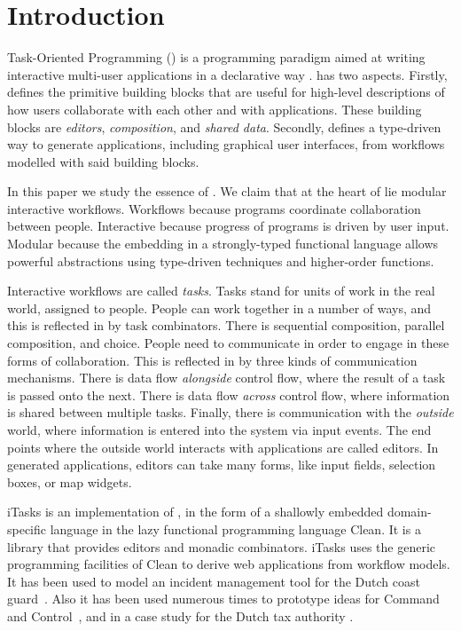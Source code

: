 


\section{Introduction}

Task-Oriented Programming (\TOP) is a programming paradigm aimed at writing interactive multi-user applications in a declarative way \cite{conf/ppdp/PlasmeijerLMAK12}.
\TOP has two aspects.
Firstly, \TOP defines the primitive building blocks that are useful for high-level descriptions of how users collaborate with each other and with applications.
These building blocks are \emph{editors}, \emph{composition}, and \emph{shared data}.
Secondly, \TOP defines a type-driven way to generate applications, including graphical user interfaces, from workflows modelled with said building blocks.

In this paper we study the essence of \TOP.
We claim that at the heart of \TOP lie modular interactive workflows.
Workflows because \TOP programs coordinate collaboration between people.
Interactive because progress of \TOP programs is driven by user input.
Modular because the embedding in a strongly-typed functional language allows powerful abstractions using type-driven techniques and higher-order functions.

Interactive workflows are called \emph{tasks}.
Tasks stand for units of work in the real world, assigned to people.
People can work together in a number of ways, and this is reflected in \TOP by task combinators.
There is sequential composition, parallel composition, and choice.
People need to communicate in order to engage in these forms of collaboration.
This is reflected in \TOP by three kinds of communication mechanisms.
There is data flow \emph{alongside} control flow, where the result of a task is passed onto the next.
There is data flow \emph{across} control flow, where information is shared between multiple tasks.
Finally, there is communication with the \emph{outside} world, where information is entered into the system via input events.
The end points where the outside world interacts with \TOP applications are called editors.
In generated applications, editors can take many forms, like input fields, selection boxes, or map widgets.

iTasks is an implementation of \TOP, in the form of a shallowly embedded domain-specific language in the lazy functional programming language Clean.
It is a library that provides editors and monadic combinators.
iTasks uses the generic programming facilities of Clean to derive web applications from workflow models.
It has been used to model an incident management tool for the Dutch coast guard~\cite{conf/iscram/LijnseJP12}.
Also it has been used numerous times to prototype ideas for Command and Control~\cite{theses/nlda/Kool17, theses/radboud/Stutterheim17}, and in a case study for the Dutch tax authority \cite{conf/sfp/StutterheimAP17}.



